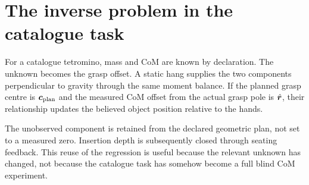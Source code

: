 \section{The inverse problem in the catalogue task}

For a catalogue tetromino, mass and CoM are known by declaration. The unknown becomes the grasp offset. A static hang supplies the two components perpendicular to gravity through the same moment balance. If the planned grasp centre is $\bm{c}_{\mathrm{plan}}$ and the measured CoM offset from the actual grasp pole is $\hat{\bm{r}}$, their relationship updates the believed object position relative to the hands.

The unobserved component is retained from the declared geometric plan, not set to a measured zero. Insertion depth is subsequently closed through seating feedback. This reuse of the regression is useful because the relevant unknown has changed, not because the catalogue task has somehow become a full blind CoM experiment.

